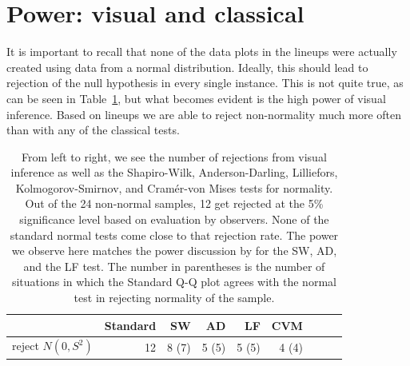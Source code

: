 \documentclass{article}\usepackage[]{graphicx}\usepackage[]{color}
\begin{document}
\section{Power: visual and classical}\label{sec:power2}

It is important to recall that none of the data plots in the lineups were actually created using data from a normal distribution. Ideally, this should lead to rejection of the null hypothesis in every single instance.
This is not quite true, as can be seen in Table~\ref{tab:reject}, but what becomes evident is the high power  of visual inference. Based on lineups we are able to reject non-normality much more often than with any of the classical tests.


\begin{table}[ht]
\centering
\caption{\label{tab:reject}
 From left to right, we see the number of rejections from visual inference as well as the  Shapiro-Wilk, Anderson-Darling, Lilliefors,  Kolmogorov-Smirnov, and Cram\'er-von Mises tests for normality. Out of the 24 non-normal samples, 12 get rejected at the 5\% significance level based on evaluation by observers. None of the standard normal tests come close to that rejection rate. The power we observe here matches the power discussion by \citet{razali:2011} for the SW, AD, and the LF  test. The number in parentheses is the number of situations in which the Standard Q-Q plot agrees with the normal test in rejecting normality of the sample.}

\begin{tabular}{rrrrrrrrr}
  \hline
 & Standard  & SW & AD & LF   & CVM & \\ 
  \hline
  \hline
  reject $N(0,S^2)$  & 12  &  8 (7) & 5 (5) &  5 (5) & 4 (4) & \\ 
\hline
\end{tabular}
\end{table}
\end{document}
